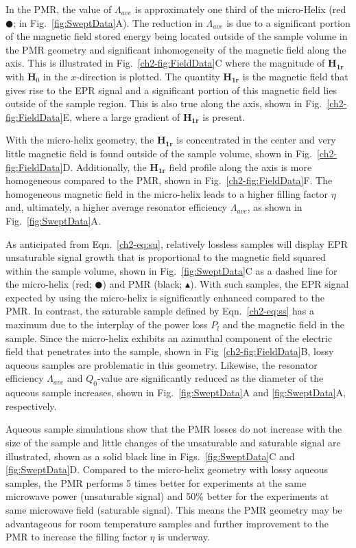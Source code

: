 In the PMR, the value of $\Lambda_{ave}$ is approximately one third of the micro-Helix (red $\CIRCLE$; in Fig.~\ref{fig:SweptData}A). The reduction in $\Lambda_{ave}$ is due to a significant portion of the magnetic field stored energy being located outside of the sample volume in the PMR geometry and significant inhomogeneity of the magnetic field along the axis. This is illustrated in Fig.~\ref{ch2-fig:FieldData}C where the magnitude of $\mathbf{H_{1r}}$ with $\mathbf{H}_0$ in the $x$-direction is plotted. The quantity $\mathbf{H_{1r}}$ is the magnetic field that gives rise to the EPR signal and a significant portion of this magnetic field lies outside of the sample region. This is also true along the axis, shown in Fig.~\ref{ch2-fig:FieldData}E, where a large gradient of $\mathbf{H_{1r}}$ is present. 

With the micro-helix geometry, the $\mathbf{H_{1r}}$ is concentrated in the center and very little magnetic field is found outside of the sample volume, shown in Fig.~\ref{ch2-fig:FieldData}D. Additionally, the $\mathbf{H_{1r}}$ field profile along the axis is more homogeneous compared to the PMR, shown in  Fig.~\ref{ch2-fig:FieldData}F. The homogeneous magnetic field in the micro-helix leads to a higher filling factor $\eta$ and, ultimately, a higher average resonator efficiency $\Lambda_{ave}$, as shown in Fig.~\ref{fig:SweptData}A.

As anticipated from Eqn.~\ref{ch2-eq:su}, relatively lossless samples will display EPR unsaturable signal growth that is proportional to the magnetic field squared within the sample volume, shown in Fig.~\ref{fig:SweptData}C as a dashed line for the micro-helix (red; $\CIRCLE$) and PMR (black; $\blacktriangle$). With such samples, the EPR signal expected by using the micro-helix is significantly enhanced compared to the PMR. In contrast, the saturable sample defined by  Eqn.~\ref{ch2-eq:ss} has a maximum due to the interplay of the power loss $P_l$ and the magnetic field in the sample. Since the micro-helix exhibits an azimuthal component of the electric field that penetrates into the sample, shown in Fig~\ref{ch2-fig:FieldData}B, lossy aqueous samples are problematic in this geometry. Likewise, the  resonator efficiency $\Lambda_{ave}$ and $Q_0$-value are significantly reduced as the diameter of the aqueous sample increases, shown in Fig.~\ref{fig:SweptData}A and \ref{fig:SweptData}A, respectively.

Aqueous sample simulations show that the PMR losses do not increase with the size of the sample and little changes of the unsaturable and saturable signal are illustrated, shown as a solid black line in Figs.~\ref{fig:SweptData}C and \ref{fig:SweptData}D. Compared to the micro-helix geometry with lossy aqueous samples, the PMR performs 5 times better for experiments at the same microwave power (unsaturable signal) and 50\% better for the experiments at same microwave field (saturable signal). This means the PMR geometry may be advantageous for room temperature samples and further improvement to the PMR to increase the filling factor $\eta$ is underway. 

